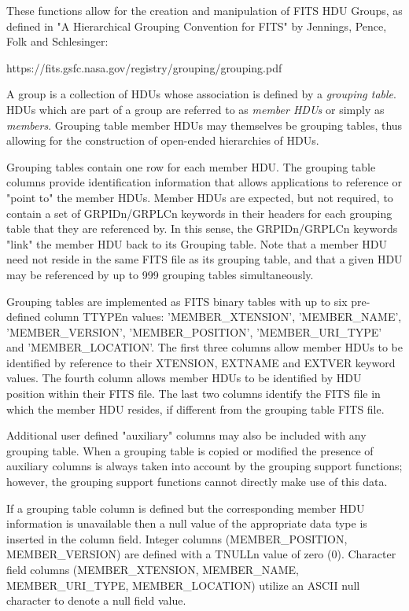 \documentclass[11pt]{book}
\begin{document}
These functions allow for the creation and manipulation of FITS HDU
Groups, as defined in "A Hierarchical Grouping Convention for FITS" by
Jennings, Pence, Folk and Schlesinger:

https://fits.gsfc.nasa.gov/registry/grouping/grouping.pdf

A group is a
collection of HDUs whose association is defined by a {\it grouping
table}.  HDUs which are part of a group are referred to as {\it member
HDUs} or simply as {\it members}. Grouping table member HDUs may
themselves be grouping tables, thus allowing for the construction of
open-ended hierarchies of HDUs.

Grouping tables contain one row for each member HDU. The grouping table
columns provide identification information that allows applications to
reference or "point to" the member HDUs. Member HDUs are expected, but
not required, to contain a set of GRPIDn/GRPLCn keywords in their
headers for each grouping table that they are referenced by. In this
sense, the GRPIDn/GRPLCn keywords "link" the member HDU back to its
Grouping table. Note that a member HDU need not reside in the same FITS
file as its grouping table, and that a given HDU may be referenced by
up to 999 grouping tables simultaneously.

Grouping tables are implemented as FITS binary tables with up to six
pre-defined column TTYPEn values: 'MEMBER\_XTENSION', 'MEMBER\_NAME',
'MEMBER\_VERSION', 'MEMBER\_POSITION', 'MEMBER\_URI\_TYPE' and 'MEMBER\_LOCATION'.
The first three columns allow member HDUs to be identified by reference to
their XTENSION, EXTNAME and EXTVER keyword values. The fourth column allows
member HDUs to be identified by HDU position within their FITS file.
The last two columns identify the FITS file in which the member HDU resides,
if different from the grouping table FITS file.

Additional user defined "auxiliary" columns may also be included with any
grouping table. When a grouping table is copied or modified the presence of
auxiliary columns is always taken into account by the grouping support
functions; however, the grouping support functions cannot directly
make use of this data.

If a grouping table column is defined but the corresponding member HDU
information is unavailable then a null value of the appropriate data type
is inserted in the column field. Integer columns (MEMBER\_POSITION,
MEMBER\_VERSION) are defined with a TNULLn value of zero (0). Character field
columns (MEMBER\_XTENSION, MEMBER\_NAME, MEMBER\_URI\_TYPE, MEMBER\_LOCATION)
utilize an ASCII null character to denote a null field value.
\end{document}
